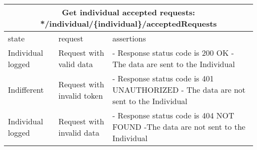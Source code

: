 \begin{center}
	\begin{tabular}{|p{}|p{}|p{}|}
		\hline
		\multicolumn{3}{c}{Get individual accepted requests: */individual/\{individual\}/acceptedRequests}\\

		\hline
		state & request & assertions \\
		
		\hline
		Individual logged&
		Request with valid data & 
		- Response status code is 200 OK\newline
		- The data are sent to the Individual
		\\
		
		\hline
		Indifferent&
		Request with invalid token & 
		- Response status code is 401 UNAUTHORIZED \newline
		- The data are not sent to the Individual
		\\
		
		\hline
		Individual logged&
		Request with invalid data& 
		- Response status code is 404 NOT FOUND \newline
		-The data are not sent to the Individual
		\\
		\hline
	\end{tabular}
\end{center}


